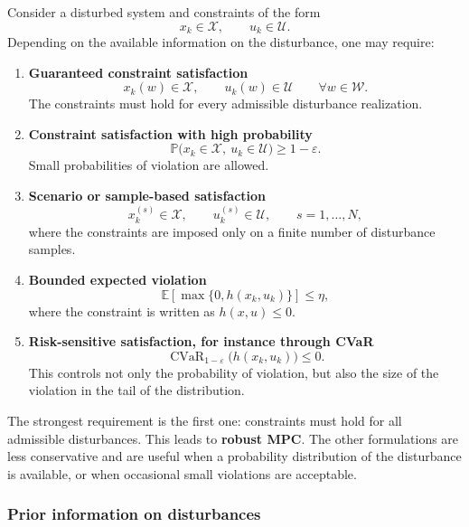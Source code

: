\begin{theorembox}
Consider a disturbed system and constraints of the form
\[
x_k \in \mathcal X, \qquad u_k \in \mathcal U.
\]
Depending on the available information on the disturbance, one may require:

\begin{enumerate}
    \item \textbf{Guaranteed constraint satisfaction}
    \[
    x_k(w) \in \mathcal X,\qquad u_k(w)\in \mathcal U
    \qquad \forall w \in \mathcal W.
    \]
    The constraints must hold for every admissible disturbance realization.

    \item \textbf{Constraint satisfaction with high probability}
    \[
    \mathbb P\big(x_k \in \mathcal X,\ u_k\in \mathcal U\big) \ge 1-\varepsilon.
    \]
    Small probabilities of violation are allowed.

    \item \textbf{Scenario or sample-based satisfaction}
    \[
    x_k^{(s)}\in \mathcal X,\qquad u_k^{(s)}\in \mathcal U,
    \qquad s=1,\dots,N,
    \]
    where the constraints are imposed only on a finite number of disturbance samples.

    \item \textbf{Bounded expected violation}
    \[
    \mathbb E\left[\max\{0,h(x_k,u_k)\}\right]\le \eta,
    \]
    where the constraint is written as $h(x,u)\le 0$.

    \item \textbf{Risk-sensitive satisfaction, for instance through CVaR}
    \[
    \operatorname{CVaR}_{1-\varepsilon}\big(h(x_k,u_k)\big)\le 0.
    \]
    This controls not only the probability of violation, but also the size of the violation
    in the tail of the distribution.
\end{enumerate}
\end{theorembox}

The strongest requirement is the first one: constraints must hold for all admissible
disturbances. This leads to \textbf{robust MPC}. The other formulations are less conservative
and are useful when a probability distribution of the disturbance is available, or when occasional
small violations are acceptable.

\subsubsection{Prior information on disturbances}

